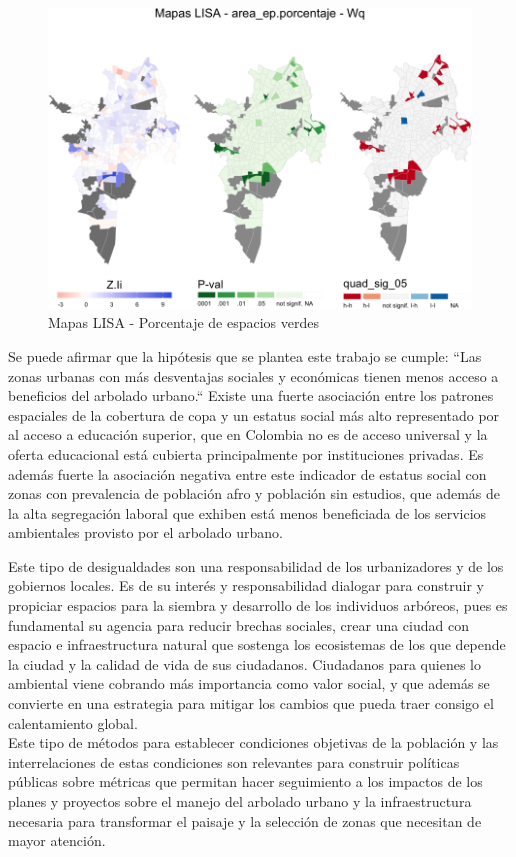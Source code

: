 \documentclass[12pt,]{book}
\begin{document}
\begin{figure}
\includegraphics[width=1\linewidth]{tesis-unigis_files/figure-latex/lisa-areaep-au-1} \caption{Mapas LISA - Porcentaje de espacios verdes}\label{fig:lisa-areaep-au}
\end{figure}

Se puede afirmar que la hipótesis que se plantea este trabajo se cumple:
``Las zonas urbanas con más desventajas sociales y económicas tienen
menos acceso a beneficios del arbolado urbano.`` Existe una fuerte
asociación entre los patrones espaciales de la cobertura de copa y un
estatus social más alto representado por al acceso a educación superior,
que en Colombia no es de acceso universal y la oferta educacional está
cubierta principalmente por instituciones privadas. Es además fuerte la
asociación negativa entre este indicador de estatus social con zonas con
prevalencia de población afro y población sin estudios, que además de la
alta segregación laboral que exhiben
\citep{arroyo_mina_afrocolombianos_2016, mora_brechas_2014, ceron_indice_2014}
está menos beneficiada de los servicios ambientales provisto por el
arbolado urbano.

Este tipo de desigualdades son una responsabilidad de los urbanizadores
y de los gobiernos locales. Es de su interés y responsabilidad dialogar
para construir y propiciar espacios para la siembra y desarrollo de los
individuos arbóreos, pues es fundamental su agencia para reducir brechas
sociales, crear una ciudad con espacio e infraestructura natural que
sostenga los ecosistemas de los que depende la ciudad y la calidad de
vida de sus ciudadanos. Ciudadanos para quienes lo ambiental viene
cobrando más importancia como valor social, y que además se convierte en
una estrategia para mitigar los cambios que pueda traer consigo el
calentamiento global.\\
Este tipo de métodos para establecer condiciones objetivas de la
población y las interrelaciones de estas condiciones son relevantes para
construir políticas públicas sobre métricas que permitan hacer
seguimiento a los impactos de los planes y proyectos sobre el manejo del
arbolado urbano y la infraestructura necesaria para transformar el
paisaje y la selección de zonas que necesitan de mayor atención.
\end{document}
